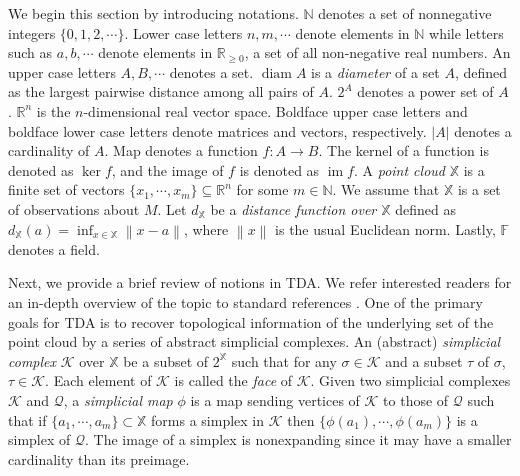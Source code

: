 \documentclass[11pt]{article}
\newcommand{\bbR}{\mathbb{R}}
\newcommand{\bbN}{\mathbb{N}}
\newcommand{\norm}[1]{\left\lVert#1\right\rVert}
\newcommand{\im}{\operatorname{im}}
\DeclareMathOperator*{\diam}{diam} %
\newcommand{\ptcloudx}{\mathbb{X}} %
\begin{document}
We begin this section by introducing notations. $\bbN$ denotes a set of nonnegative integers $\{ 0,1,2,\cdots\}$. Lower case letters $n,m,\cdots$ denote elements in $\bbN$ while letters such as $a,b, \cdots$ denote elements in $\bbR_{\geq0}$, a set of all non-negative real numbers. An upper case letters $A,B, \cdots$ denotes a set. $\diam A$ is a \emph{diameter} of a set $A$, defined as the largest pairwise distance among all pairs of $A$. $2^{A}$ denotes a power set of $A$. $\bbR^{n}$ is the $n$-dimensional real vector space. Boldface upper case letters and boldface lower case letters denote matrices and vectors, respectively. $|A|$ denotes a cardinality of $A$. Map denotes a function $f: A \to B$. The kernel of a function is denoted as $\ker f$, and the image of $f$ is denoted as $\im f$. A \emph{point cloud} $\ptcloudx$ is a finite set of vectors $\{x_{1},\cdots, x_{m} \} \subseteq \bbR^{n}$ for some $m\in \bbN.$ We assume that $\ptcloudx$ is a set of observations about $M$. Let $d_{\ptcloudx}$ be a \emph{distance function over $\ptcloudx$} defined as $d_{\ptcloudx}(a) = \inf_{x \in \ptcloudx}\norm{x-a}$, where $\norm{x}$ is the usual Euclidean norm. Lastly, $\mathbb{F}$ denotes a field.


Next, we provide a brief review of notions in TDA. We refer interested readers for an in-depth overview of the topic to standard references \citep{edelsbrunner,MR2549932,MR2572029,MR3328629}. One of the primary goals for TDA is to recover topological information of the underlying set of the point cloud by a series of abstract simplicial complexes. An (abstract) \emph{simplicial complex} $\mathcal{K}$ over $\ptcloudx$ be a subset of $2^{\ptcloudx}$ such that for any $\sigma \in \mathcal{K}$ and a subset $\tau$ of $\sigma$, $\tau \in \mathcal{K}$. Each element of $\mathcal{K}$ is called the \emph{face} of $\mathcal{K}$. Given two simplicial complexes $\mathcal{K}$ and $\mathcal{Q}$, a \emph{simplicial map} $\phi$ is a map sending vertices of $\mathcal{K}$ to those of $\mathcal{Q}$ such that if $\{ a_{1},\cdots, a_{m} \} \subset \ptcloudx$ forms a simplex in $\mathcal{K}$ then $\{ \phi(a_{1}),\cdots, \phi(a_{m}) \}$ is a simplex of $\mathcal{Q}$. The image of a simplex is nonexpanding since it may have a smaller cardinality than its preimage. 
\end{document}
